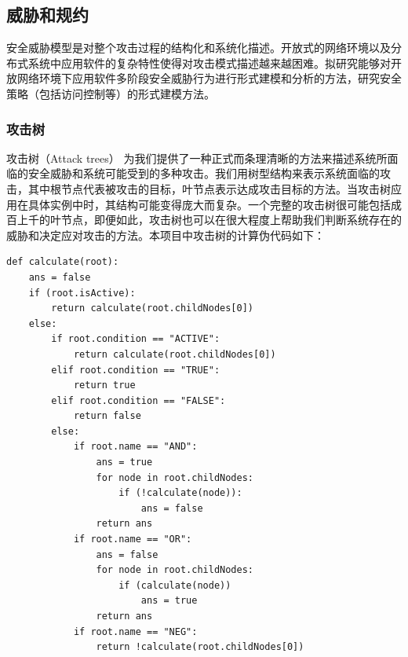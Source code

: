\subsection{威胁和规约}
安全威胁模型是对整个攻击过程的结构化和系统化描述。开放式的网络环境以及分布式系统中应用软件的复杂特性使得对攻击模式描述越来越困难。拟研究能够对开放网络环境下应用软件多阶段安全威胁行为进行形式建模和分析的方法，研究安全策略（包括访问控制等）的形式建模方法。
\subsubsection{攻击树}
攻击树（Attack trees） 为我们提供了一种正式而条理清晰的方法来描述系统所面临的安全威胁和系统可能受到的多种攻击。我们用树型结构来表示系统面临的攻击，其中根节点代表被攻击的目标，叶节点表示达成攻击目标的方法。当攻击树应用在具体实例中时，其结构可能变得庞大而复杂。一个完整的攻击树很可能包括成百上千的叶节点，即便如此，攻击树也可以在很大程度上帮助我们判断系统存在的威胁和决定应对攻击的方法。本项目中攻击树的计算伪代码如下：
\lstset{
	caption=攻击树的计算, 
	basicstyle=\ttfamily\footnotesize,
	frame=tb,
	xleftmargin=.01\textwidth, xrightmargin=.01\textwidth
}
\begin{lstlisting}
def calculate(root):
	ans = false
	if (root.isActive):
		return calculate(root.childNodes[0])
	else:
		if root.condition == "ACTIVE":
			return calculate(root.childNodes[0])
		elif root.condition == "TRUE":
			return true
		elif root.condition == "FALSE":
			return false
		else:
			if root.name == "AND":
				ans = true
				for node in root.childNodes:
					if (!calculate(node)):
						ans = false
				return ans
			if root.name == "OR":
				ans = false
				for node in root.childNodes:
					if (calculate(node))
						ans = true
				return ans
			if root.name == "NEG":
				return !calculate(root.childNodes[0])

\end{lstlisting}
